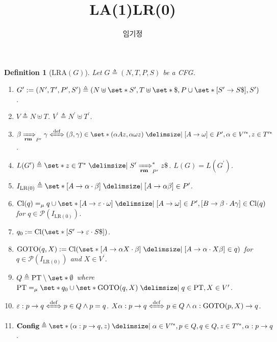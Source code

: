 \documentclass[12pt]{article}
\title{LA{(1)}LR{(0)}}
\author{임기정}
\newtheorem{definition}[theorem]{Definition}
\newcommand{\powerset}{ \ensuremath{\mathcal{P}} }
\begin{document}
\thispagestyle{empty}

\begin{definition}[$\mathrm{LRA}(G)$]
Let \(G \triangleq ( N , T , P , S )\) be a CFG{.}
\begin{enumerate} \setlength{\itemsep}{0.2pt} \setlength{\parskip}{0.2pt}
\item[$\mathrm{(i)}$] $G^\prime := ( N^\prime , T^\prime , P^\prime , S^\prime ) \triangleq ( N \uplus \set*{ S^\prime } , T \uplus \set*{ \$ } , P \cup \set*{ [ S^\prime \to S \$ ] } , S^\prime )$.
\item[$\mathrm{(ii)}$] $V \triangleq N \uplus T$. $V^\prime \triangleq N^\prime \uplus T^\prime$.
\item[$\mathrm{(iii)}$] $\beta \xRightarrow[\mathbf{rm}]{}_{P^\prime} \gamma \xLeftrightarrow[]{\mathrm{def}} ( \beta , \gamma ) \in \set*{ ( \alpha A z , \alpha \omega z ) \mid [ A \to \omega ] \in P^\prime , \alpha \in V^{\prime \ast}, z \in T^{\prime \ast} }$.
\item[$\mathrm{(iv)}$] $L ( G^\prime ) \triangleq \set*{ z \in { T }^\ast \mid S^\prime \xRightarrow[\mathbf{rm}]{}_{P^\prime}^\ast z \$ }$. $L ( G ) = L ( G^\prime )$.
\item[$\mathrm{(v)}$] $I_{\mathrm{LR(0)}} \triangleq \set*{ [ A \to \alpha \cdot \beta ] \mid [ A \to \alpha \beta ] \in P^\prime }$.
\item[$\mathrm{(vi)}$] $\mathrm{Cl} ( q ) =_\mu q \cup \set*{ [ A \to \varepsilon \cdot \omega ] \mid [ A \to \omega ] \in P^\prime , [ B \to \beta \cdot A \gamma ] \in \mathrm{Cl} ( q ) }$ for $ q \in \powerset ( I_{\mathrm{LR(0)}} ) $.
\item[$\mathrm{(vii)}$] $q_0 := \mathrm{Cl} ( \set*{ [ S^\prime \to \varepsilon \cdot S \$ ] } )$.
\item[$\mathrm{(viii)}$] $\mathrm{GOTO} ( q , X ) := \mathrm{Cl} ( \set*{ [ A \to \alpha X \cdot \beta ] \mid [ A \to \alpha \cdot X \beta ] \in q } )$ for $q \in \powerset ( I_{\mathrm{LR(0)}} )$ and $X \in V^\prime$.
\item[$\mathrm{(ix)}$] $Q \triangleq \mathrm{PT} \setminus \set*{ \emptyset }$ where $\mathrm{PT} =_\mu \set*{ q_0 } \cup \set*{ \mathrm{GOTO} ( q , X ) \mid q \in \mathrm{PT} , X \in V^\prime }$.
\item[$\mathrm{(x)}$] $\varepsilon : p \to q \xLeftrightarrow[]{\mathrm{def}} p \in Q \land p = q$. $X \alpha : p \to q \xLeftrightarrow[]{\mathrm{def}} p \in Q \land \alpha : \mathrm{GOTO} ( p , X ) \to q$.
\item[$\mathrm{(xi)}$] $\mathbf{Config} \triangleq \set*{ ( \alpha : p \to q , z ) \mid \alpha \in V^{\prime \ast}, p \in Q , q \in Q , z \in T^{\prime \ast} , \alpha : p \to q } $.

\end{enumerate}
\end{definition}
\end{document}
